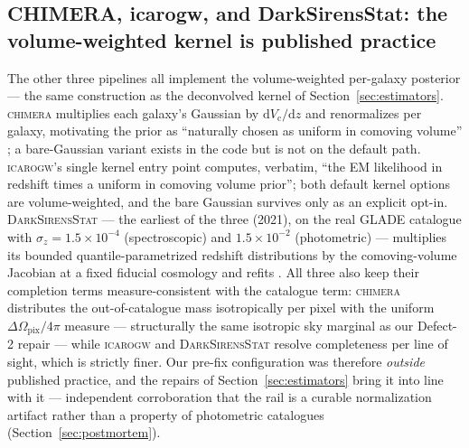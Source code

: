 \subsection{CHIMERA, icarogw, and DarkSirensStat: the volume-weighted kernel is published practice}

The other three pipelines all implement the volume-weighted per-galaxy posterior --- the same construction as the deconvolved kernel of Section~\ref{sec:estimators}. \textsc{chimera} multiplies each galaxy's Gaussian by $\mathrm{d}V_\mathrm{c}/\mathrm{d}z$ and renormalizes per galaxy, motivating the prior as ``naturally chosen as uniform in comoving volume'' \citep{Borghi:2023opd, Gair:2022zsa}; a bare-Gaussian variant exists in the code but is not on the default path. %
\textsc{icarogw}'s single kernel entry point computes, verbatim, ``the EM likelihood in redshift times a uniform in comoving volume prior''; both default kernel options are volume-weighted, and the bare Gaussian survives only as an explicit opt-in. %
\textsc{DarkSirensStat} --- the earliest of the three (2021), on the real GLADE catalogue with $\sigma_z = 1.5\times10^{-4}$ (spectroscopic) and $1.5\times10^{-2}$ (photometric) --- multiplies its bounded quantile-parametrized redshift distributions by the comoving-volume Jacobian at a fixed fiducial cosmology and refits \citep{Finke:2021aom}. %
All three also keep their completion terms measure-consistent with the catalogue term: \textsc{chimera} distributes the out-of-catalogue mass isotropically per pixel with the uniform $\Delta\Omega_\mathrm{pix}/4\pi$ measure --- structurally the same isotropic sky marginal as our Defect-2 repair --- while \textsc{icarogw} and \textsc{DarkSirensStat} resolve completeness per line of sight, which is strictly finer. %
Our pre-fix configuration was therefore \emph{outside} published practice, and the repairs of Section~\ref{sec:estimators} bring it into line with it --- independent corroboration that the rail is a curable normalization artifact rather than a property of photometric catalogues (Section~\ref{sec:postmortem}). %

